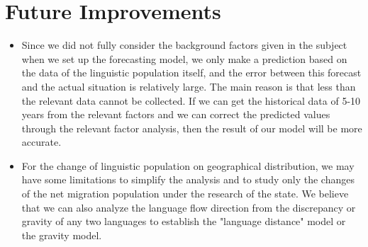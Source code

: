 \section{Future Improvements}

\begin{itemize}
\item Since we did not fully consider the background factors given in the subject when we set up the forecasting model, we only make a prediction based on the data of the linguistic population itself, and the error between this forecast and the actual situation is relatively large. The main reason is that less than the relevant data cannot be collected. If we can get the historical data of 5-10 years from the relevant factors and we can correct the predicted values through the relevant factor analysis, then the result of our model will be more accurate.
\item For the change of linguistic population on geographical distribution, we may have some limitations to simplify the analysis and to study only the changes of the net migration population under the research of the state. We believe that we can also analyze the language flow direction from the discrepancy or gravity of any two languages to establish the "language distance" model or the gravity model.
\end{itemize}